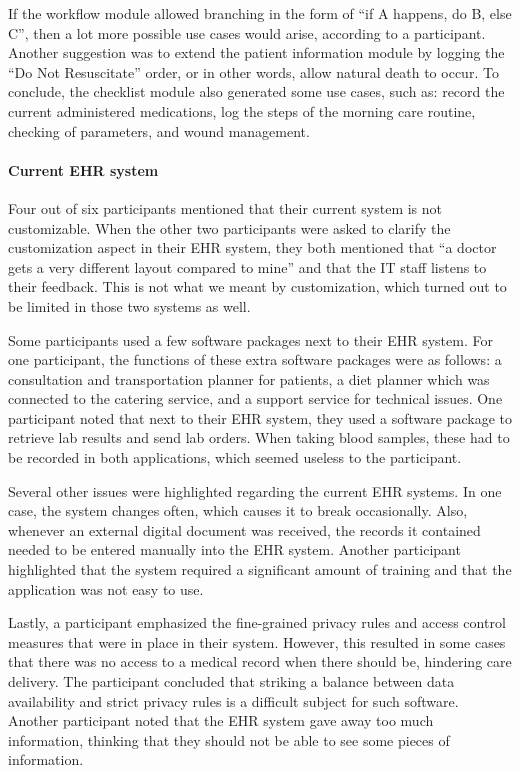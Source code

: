     If the workflow module allowed branching in the form of ``if A happens, do B, else C'', then a lot more possible use cases would arise, according to a participant. Another suggestion was to extend the patient information module by logging the ``Do Not Resuscitate'' order, or in other words, allow natural death to occur. To conclude, the checklist module also generated some use cases, such as: record the current administered medications, log the steps of the morning care routine, checking of parameters, and wound management.

    \paragraph{Current EHR system}

    Four out of six participants mentioned that their current system is not customizable. When the other two participants were asked to clarify the customization aspect in their EHR system, they both mentioned that ``a doctor gets a very different layout compared to mine'' and that the IT staff listens to their feedback. This is not what we meant by customization, which turned out to be limited in those two systems as well.

    Some participants used a few software packages next to their EHR system. For one participant, the functions of these extra software packages were as follows: a consultation and transportation planner for patients, a diet planner which was connected to the catering service, and a support service for technical issues. One participant noted that next to their EHR system, they used a software package to retrieve lab results and send lab orders. When taking blood samples, these had to be recorded in both applications, which seemed useless to the participant.

    Several other issues were highlighted regarding the current EHR systems. In one case, the system changes often, which causes it to break occasionally. Also, whenever an external digital document was received, the records it contained needed to be entered manually into the EHR system. Another participant highlighted that the system required a significant amount of training and that the application was not easy to use.

    Lastly, a participant emphasized the fine-grained privacy rules and access control measures that were in place in their system. However, this resulted in some cases that there was no access to a medical record when there should be, hindering care delivery. The participant concluded that striking a balance between data availability and strict privacy rules is a difficult subject for such software. Another participant noted that the EHR system gave away too much information, thinking that they should not be able to see some pieces of information.

